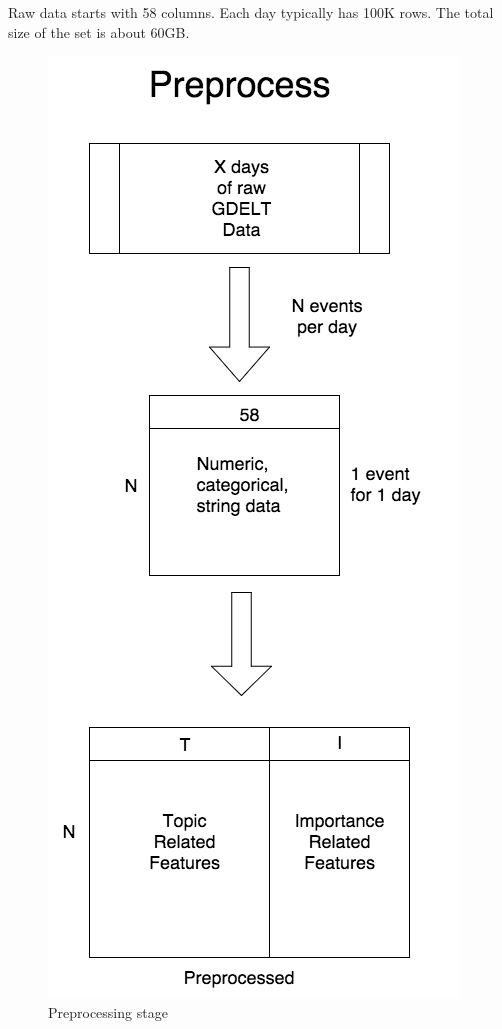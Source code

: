 Raw data starts with 58 columns. Each day typically has 100K rows. The total size of the set is about 60GB. %

\begin{figure}[ht]
\vskip 0.2in
\begin{center}
\centerline{\includegraphics[scale=0.15]{images/preprocess_vertical.png}}
\caption{Preprocessing stage}
\end{center}
\vskip -0.2in
\label{fig:preprocess}
\end{figure}

